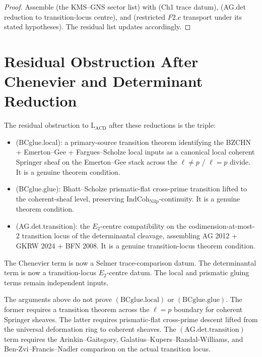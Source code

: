 \begin{proof}
Assemble
 (the KMS--GNS sector list) with
 (Ch1 trace datum),
 (AG.det reduction to
transition-locus centre), and
 (restricted \(F2.c\)
transport under its stated hypotheses).
The residual list updates accordingly.
\end{proof}

\section{Residual Obstruction After Chenevier and Determinant Reduction}
\label{v4-arith:w5-h:residual-obstruction}

\begin{remark}
\label{v4-arith:w5-h:rem:genuine-core-residual}
The residual obstruction to \(\mathrm{L}_{\mathrm{ACD}}\) after these
reductions is the triple:
\begin{itemize}
\item (BCglue.local): a primary-source transition theorem identifying
the BZCHN + Emerton--Gee + Fargues--Scholze local inputs as a
canonical local coherent Springer sheaf on the Emerton--Gee stack
across the \(\ell\neq p\) / \(\ell=p\) divide. It is a genuine
theorem condition.
\item (BCglue.glue): Bhatt--Scholze prismatic-flat cross-prime
transition lifted to the coherent-sheaf level, preserving
\(\mathrm{IndCoh}_{\mathrm{Nilp}}\)-continuity. It is a genuine
theorem condition.
\item (AG.det.transition): the \(E_{2}\)-centre compatibility on the
codimension-at-most-\(2\) transition locus of the determinantal
cleavage, assembling AG 2012 + GKRW 2024 + BFN 2008. It is a genuine
transition-locus theorem condition.
\end{itemize}
The Chenevier term is now a Selmer trace-comparison datum. The
determinantal term is now a transition-locus \(E_{2}\)-centre datum.
The local and prismatic gluing terms remain independent inputs.
\end{remark}

\begin{remark}
\label{v4-arith:w5-h:rem:what-wave5-cannot-touch}
The arguments above do not prove \((\mathrm{BCglue.local})\) or
\((\mathrm{BCglue.glue})\). The former requires a transition theorem
across the \(\ell=p\) boundary for coherent Springer sheaves. The
latter requires prismatic-flat cross-prime descent lifted from the
universal deformation ring to coherent sheaves. The
\((\mathrm{AG.det.transition})\) term requires the
Arinkin--Gaitsgory, Galatius--Kupers--Randal-Williams, and
Ben-Zvi--Francis--Nadler comparison on the actual transition locus.
\end{remark}

